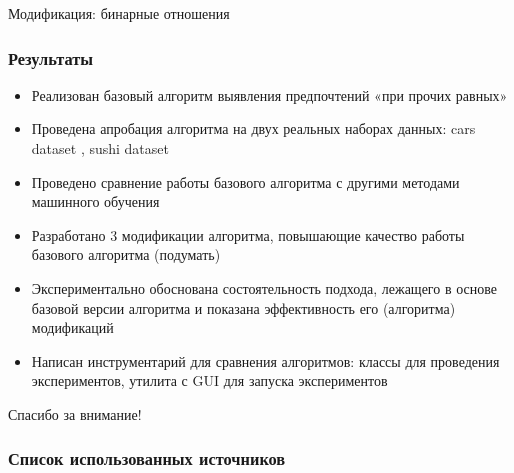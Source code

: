 \documentclass{beamer}
\theoremstyle{definition}
\begin{document}
	\begin{frame}
		Модификация: бинарные отношения	
	\end{frame}
	
	
	\begin{frame}
		\frametitle{Результаты}
		\begin{itemize}
			\item Реализован базовый алгоритм выявления предпочтений «при прочих равных»
			\item Проведена апробация алгоритма на двух реальных наборах данных: cars dataset \cite{dataset:Abbasnejad:2013}, sushi dataset \cite{Kamishima:2003} 
			\item Проведено сравнение работы базового алгоритма с другими методами машинного обучения
			\item Разработано 3 модификации алгоритма, повышающие качество работы базового алгоритма (подумать)
			\item Экспериментально обоснована состоятельность подхода, лежащего в основе базовой версии алгоритма и показана  эффективность его (алгоритма) модификаций
		\end{itemize}
		\pause
		\begin{itemize}
			\item {\color{gray} Написан инструментарий для сравнения алгоритмов: классы для проведения экспериментов, утилита с GUI для запуска экспериментов}
		\end{itemize}
	\end{frame}
		
	\begin{frame}[plain,c]
		\begin{center}
			\Huge Спасибо за внимание!
		\end{center}
	\end{frame}

	\begin{frame}[allowframebreaks]
		\frametitle{Список использованных источников}
		
		
	\end{frame}
	
\end{document}

